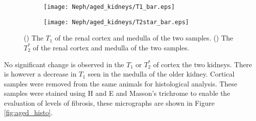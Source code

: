 \begin{figure}[H]
	\centering
	\begin{subfigure}[c]{0.47\textwidth}
		\centering
		\texttt{[image: Neph/aged\_kidneys/T1\_bar.eps]}
		\caption{}
		\label{fig:neph_aged_t1_bar}
	\end{subfigure}
	\hfill
	\begin{subfigure}[c]{0.47\textwidth}
		\centering
		\texttt{[image: Neph/aged\_kidneys/T2star\_bar.eps]}
		\caption{}
		\label{fig:neph_aged_t2star_bar}
	\end{subfigure}
	\caption{() The $T_1$ of the renal cortex and medulla of the two samples. () The $T_2^*$ of the renal cortex and medulla of the two samples.}
	\label{fig:aged_bar}
\end{figure}

No significant change is observed in the $T_1$ or $T_2^*$ of cortex the two kidneys. There is however a decrease in $T_1$ seen in the medulla of the older kidney. Cortical samples were removed from the same animals for histological analysis. These samples were stained using \ac{H and E} and Masson's trichrome to enable the evaluation of levels of fibrosis, these micrographs are shown in Figure \ref{fig:aged_histo}. 

